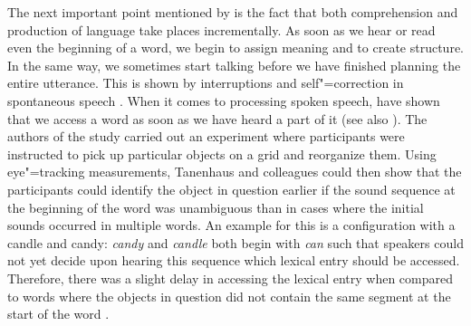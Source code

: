 The next important point mentioned by \citet{SW2011a} is the fact that both comprehension and production of language take places incrementally.
As soon as we hear or read even the beginning of a word, we begin to assign meaning and to create structure.
In the same way, we sometimes start talking before we have finished planning the entire utterance.
This is shown by interruptions and self"=correction in spontaneous speech \citep{CW98a,CFT2002a}.
When it comes to processing spoken speech, \citet{TSKES96a} have shown that we access a word as soon
as we have heard a part of it (see also \citealp{Marslen-Wilson75a}).  The authors of the study carried out an experiment where participants were instructed
to pick up particular objects on a grid and reorganize them. Using eye"=tracking measurements,
Tanenhaus and colleagues could then show that the participants could identify the object in question
earlier if the sound sequence at the beginning of the word was unambiguous than in cases 
where the initial sounds occurred in multiple words. An example for this is a configuration with a candle and candy: \emph{candy} and \emph{candle}
both begin with \emph{can} such that speakers could not yet decide upon hearing this sequence which lexical entry should be accessed. Therefore, there
was a slight delay in accessing the lexical entry when compared to words where the objects in question did not contain the same segment at the
start of the word \citep[]{TSKES95a}.


